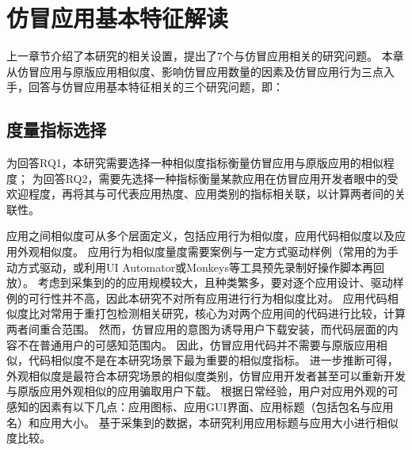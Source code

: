 \chapter{仿冒应用基本特征解读}
\label{chp:discoveries_basic}

上一章节介绍了本研究的相关设置，提出了7个与仿冒应用相关的研究问题。
本章从仿冒应用与原版应用相似度、影响仿冒应用数量的因素及仿冒应用行为三点入手，回答与仿冒应用基本特征相关的三个研究问题，即：


\section{度量指标选择}

为回答RQ1，本研究需要选择一种相似度指标衡量仿冒应用与原版应用的相似程度；
为回答RQ2，需要先选择一种指标衡量某款应用在仿冒应用开发者眼中的受欢迎程度，再将其与可代表应用热度、应用类别的指标相关联，以计算两者间的关联性。

\vspace{0.5mm}
\vspace{0.5mm}

应用之间相似度可从多个层面定义，包括应用行为相似度，应用代码相似度以及应用外观相似度。
应用行为相似度量度需要案例与一定方式驱动样例（常用的为手动方式驱动，或利用UI Automator或Monkeys等工具预先录制好操作脚本再回放）。
考虑到采集到的的应用规模较大，且种类繁多，要对逐个应用设计、驱动样例的可行性并不高，因此本研究不对所有应用进行行为相似度比对。
应用代码相似度比对常用于重打包检测相关研究，核心为对两个应用间的代码进行比较，计算两者间重合范围。
然而，仿冒应用的意图为诱导用户下载安装，而代码层面的内容不在普通用户的可感知范围内。
因此，仿冒应用代码并不需要与原版应用相似，代码相似度不是在本研究场景下最为重要的相似度指标。
进一步推断可得，外观相似度是最符合本研究场景的相似度类别，仿冒应用开发者甚至可以重新开发与原版应用外观相似的应用骗取用户下载。
根据日常经验，用户对应用外观的可感知的因素有以下几点：应用图标、应用GUI界面、应用标题（包括包名与应用名）和应用大小。
基于采集到的数据，本研究利用应用标题与应用大小进行相似度比较。

